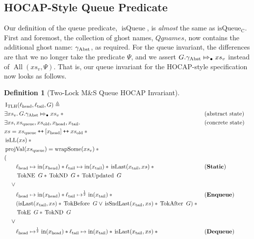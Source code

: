 \documentclass[a4paper, 10pt]{report}
\theoremstyle{definition}
\newtheorem{definition}{Definition}[section]
\newcommand{\msq}{M\&S Queue}
\newcommand{\tlmsq}{Two-Lock \msq{}}
\newcommand{\isqueue}{\operatorname{isQueue}}
\newcommand{\isqueueconc}{\operatorname{isQueue_{C}}}
\newcommand{\TLQueueInvariantHocap}{\operatorname{I_{TLH}}}
\newcommand{\Qgnames}{Qgnames}
\newcommand{\xsc}{xs}
\newcommand{\xsqueue}{xs_{\mathrm{queue}}}
\newcommand{\xsold}{xs_{\mathrm{old}}}
\newcommand{\isLL}{\operatorname{isLL}}
\newcommand{\AllP}{\operatorname{All}}
\newcommand{\projval}{\operatorname{projVal}}
\newcommand{\wrapsome}{\operatorname{wrapSome}}
\newcommand{\isLast}{\operatorname{isLast}}
\newcommand{\isSndLast}{\operatorname{isSndLast}}
\newcommand{\locN}[1]{\loc_{\mathrm{#1}}}
\newcommand{\lochead}{\locN{head}}
\newcommand{\loctail}{\locN{tail}}
\newcommand{\nIn}[1]{\operatorname{in}(#1)}
\newcommand{\node}{x}
\newcommand{\nodeN}[1]{\node_{\mathrm{#1}}}
\newcommand{\nodehead}{\nodeN{head}}
\newcommand{\nodetail}{\nodeN{tail}}
\newcommand{\absvalueList}{xs_v}
\newcommand{\StaticState}{\textbf{Static}\xspace}
\newcommand{\EnqueueState}{\textbf{Enqueue}\xspace}
\newcommand{\DequeueState}{\textbf{Dequeue}\xspace}
\newcommand{\Qg}{G}
\newcommand{\gabst}{\gname_{\mathrm{Abst}}}
\newcommand{\TokE}[1]{\operatorname{TokE} ~ #1}
\newcommand{\TokEQg}{\TokE{\Qg}}
\newcommand{\TokNE}[1]{\operatorname{TokNE} ~ #1}
\newcommand{\TokNEQg}{\TokNE{\Qg}}
\newcommand{\TokND}[1]{\operatorname{TokND} ~ #1}
\newcommand{\TokNDQg}{\TokND{\Qg}}
\newcommand{\TokBefore}[1]{\operatorname{TokBefore} ~ #1}
\newcommand{\TokBeforeQg}{\TokBefore{\Qg}}
\newcommand{\TokAfter}[1]{\operatorname{TokAfter} ~ #1}
\newcommand{\TokAfterQg}{\TokAfter{\Qg}}
\newcommand{\TokUpdated}[1]{\operatorname{TokUpdated} ~ #1}
\newcommand{\TokUpdatedQg}{\TokUpdated{\Qg}}
\newcommand\catenate{\mathbin{\text{\ttfamily\upshape ++}}}
\newcommand{\abstractstateauth}[2]{#1 \Mapsto_{\bullet} #2}
\begin{document}
\subsection{HOCAP-Style Queue Predicate}
\label{TLMSQSPECS:hocap:sub:hocap-queue-pred}
Our definition of the queue predicate, $\isqueue$, is \emph{almost} the same as $\isqueueconc$. First and foremost, the collection of ghost names, $\Qgnames$, now contains the additional ghost name: $\gabst$, as required. For the queue invariant, the differences are that we no longer take the predicate $\Psi$, and we assert $\abstractstateauth{\Qg.\gabst}{\absvalueList}$ instead of $\AllP(\absvalueList, \Psi)$. That is, our queue invariant for the HOCAP-style specification now looks as follows.
\begin{definition}[\tlmsq{} HOCAP Invariant]\label{TLMSQ:spec:hocap:invariant}
  \begin{align*}
    &\TLQueueInvariantHocap(\lochead, \loctail, \Qg) \eqdef\\
    &\Exists \absvalueList. \abstractstateauth{\Qg.\gabst}{\absvalueList} \star{} &&\text{(abstract state)}\\
    &\Exists \xsc, \xsqueue, \xsold, \nodehead, \nodetail . &&\text{(concrete state)}\\
    &\xsc = \xsqueue \catenate [\nodehead] \catenate \xsold \star{}\\
    &\isLL(\xsc) \star{}\\
    &\projval(\xsqueue) = \wrapsome(\absvalueList) \star{}\\
    &(\\
    &\quad\quad\lochead \mapsto \nIn{\nodehead} \star{} \loctail \mapsto \nIn{\nodetail} \star{} \isLast(\nodetail, \xsc) \star{} &&\text{(\StaticState)}\\
    &\quad\quad \TokNEQg \star{} \TokNDQg \star{} \TokUpdatedQg\\
    &\quad\lor{}\\
    &\quad\quad\lochead \mapsto \nIn{\nodehead} \star{} \loctail \mapsto^{\frac{1}{2}} \nIn{\nodetail} \star{} &&\text{(\EnqueueState)}\\
    &\quad\quad (\isLast(\nodetail, \xsc) \star{} \TokBeforeQg \lor{} \isSndLast(\nodetail, \xsc) \star{} \TokAfterQg) \star{}\\
    &\quad\quad \TokEQg \star{} \TokNDQg\\
    &\quad\lor{}\\
    &\quad\quad\lochead \mapsto^{\frac{1}{2}} \nIn{\nodehead} \star{} \loctail \mapsto \nIn{\nodetail} \star{} \isLast(\nodetail, \xsc) \star{} &&\text{(\DequeueState)}\\

\end{align*}
\end{definition}
\end{document}
